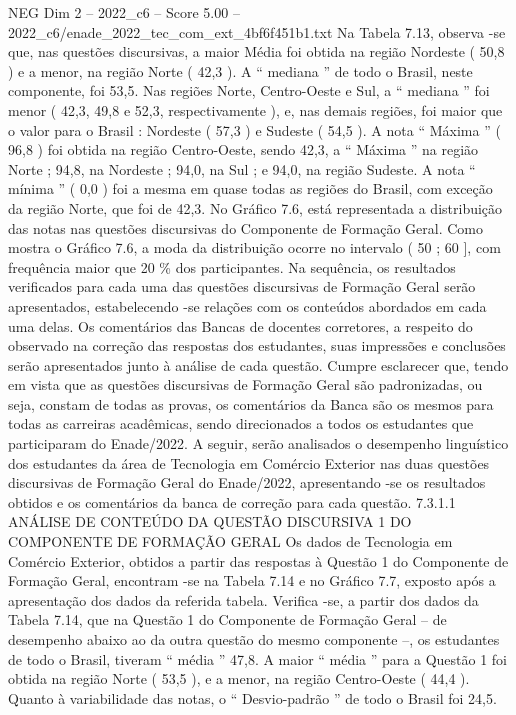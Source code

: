 \begin{textsample}{NEG Dim 2 – 2022\_c6 – Score 5.00 – 2022\_c6/enade\_2022\_tec\_com\_ext\_4bf6f451b1.txt}
Na Tabela 7.13, observa -se que, nas questões discursivas, a maior Média foi obtida na região Nordeste ( 50,8 ) e a menor, na região Norte ( 42,3 ).
A “ mediana ” de todo o Brasil, neste componente, foi 53,5.
Nas regiões Norte, Centro-Oeste e Sul, a “ mediana ” foi menor ( 42,3, 49,8 e 52,3, respectivamente ), e, nas demais regiões, foi maior que o valor para o Brasil : Nordeste ( 57,3 ) e Sudeste ( 54,5 ).
A nota “ Máxima ” ( 96,8 ) foi obtida na região Centro-Oeste, sendo 42,3, a “ Máxima ” na região Norte ; 94,8, na Nordeste ; 94,0, na Sul ; e 94,0, na região Sudeste.
A nota “ mínima ” ( 0,0 ) foi a mesma em quase todas as regiões do Brasil, com exceção da região Norte, que foi de 42,3.
No Gráfico 7.6, está representada a distribuição das notas nas questões discursivas do Componente de Formação Geral.
Como mostra o Gráfico 7.6, a moda da distribuição ocorre no intervalo ( 50 ; 60 ], com frequência maior que 20 \% dos participantes.
Na sequência, os resultados verificados para cada uma das questões discursivas de Formação Geral serão apresentados, estabelecendo -se relações com os conteúdos abordados em cada uma delas.
Os comentários das Bancas de docentes corretores, a respeito do observado na correção das respostas dos estudantes, suas impressões e conclusões serão apresentados junto à análise de cada questão.
Cumpre esclarecer que, tendo em vista que as questões discursivas de Formação Geral são padronizadas, ou seja, constam de todas as provas, os comentários da Banca são os mesmos para todas as carreiras acadêmicas, sendo direcionados a todos os estudantes que participaram do Enade/2022.
A seguir, serão analisados o desempenho linguístico dos estudantes da área de Tecnologia em Comércio Exterior nas duas questões discursivas de Formação Geral do Enade/2022, apresentando -se os resultados obtidos e os comentários da banca de correção para cada questão. 7.3.1.1 ANÁLISE DE CONTEÚDO DA QUESTÃO DISCURSIVA 1 DO COMPONENTE DE FORMAÇÃO GERAL Os dados de Tecnologia em Comércio Exterior, obtidos a partir das respostas à Questão 1 do Componente de Formação Geral, encontram -se na Tabela 7.14 e no Gráfico 7.7, exposto após a apresentação dos dados da referida tabela.
Verifica -se, a partir dos dados da Tabela 7.14, que na Questão 1 do Componente de Formação Geral – de desempenho abaixo ao da outra questão do mesmo componente –, os estudantes de todo o Brasil, tiveram “ média ” 47,8.
A maior “ média ” para a Questão 1 foi obtida na região Norte ( 53,5 ), e a menor, na região Centro-Oeste ( 44,4 ).
Quanto à variabilidade das notas, o “ Desvio-padrão ” de todo o Brasil foi 24,5.

\end{textsample}
